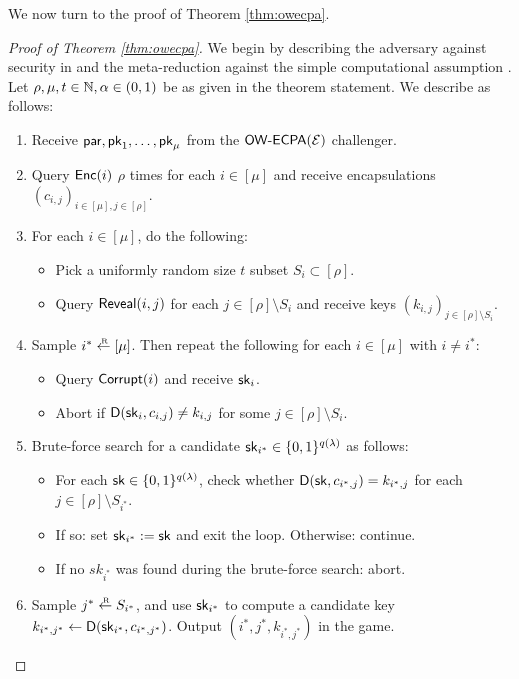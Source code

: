 We now turn to the proof of Theorem \ref{thm:owecpa}.
\begin{proof}[Proof of Theorem \ref{thm:owecpa}]
  We begin by describing the adversary \advA against \OWECPA security in \KEM
  and the meta-reduction \redM against the simple computational assumption \Simple.
  Let \(\rho, \mu, t \in \mathbb{N}, \alpha \in (0,1)\) be as given in the theorem statement.
  We describe \advA as follows:

  \begin{enumerate}[itemsep=0.1cm]
    \item Receive \(\mathsf{par}, \mathsf{pk}_{1}, \ldots, \mathsf{pk}_{\mu}\) from the \(\mathsf{OW}\text{-}\mathsf{ECPA}(\mathcal{E})\) challenger.
    \item Query \(\mathsf{Enc}(i)\) \(\rho\) times for each \(i \in [\mu]\) and receive encapsulations \((c_{i,j})_{i \in [\mu], j \in [\rho]}\).
    \item For each \(i \in [\mu]\), do the following:
          \begin{itemize}[label={\textbullet},itemsep=0.1cm]
            \item Pick a uniformly random size \(t\) subset \(S_{i} \subset [\rho]\).
            \item Query \(\mathsf{Reveal}(i,j)\) for each \(j \in [\rho] \setminus S_{i}\)
                  and receive keys \((k_{i,j})_{j \in [\rho] \setminus S_{i}}\).
          \end{itemize}
    \item\label{advA:corrupt} Sample \(i^{*} \sampleR [\mu]\). Then repeat the following for each \(i \in [\mu]\) with \(i \ne i^{*}\):
          \begin{itemize}[label={\textbullet},itemsep=0.1cm]
            \item Query \(\mathsf{Corrupt}(i)\) and receive \(\mathsf{sk}_{i}\).
            \item Abort if \(\mathsf{D}(\mathsf{sk}_{i},c_{i,j}) \ne k_{i,j}\) for some \(j \in [\rho] \setminus S_{i}\).
          \end{itemize}
     \item\label{advA:brute} Brute-force search for a candidate \(\mathsf{sk}_{i^{*}} \in \{0,1\}^{q(\lambda)}\) as follows:
          \begin{itemize}[label={\textbullet},itemsep=0.1cm]
            \item For each \(\mathsf{sk} \in \{0,1\}^{q(\lambda)}\),
                  check whether \(\mathsf{D}(\mathsf{sk},c_{i^{*},j}) = k_{i^{*},j}\) for each \(j \in [\rho] \setminus S_{i^{*}}\).
            \item If so: set \(\mathsf{sk}_{i^{*}} := \mathsf{sk}\) and exit the loop. Otherwise: continue.
            \item If no \(sk_{i^{*}}\) was found during the brute-force search: abort.
          \end{itemize}
    \item\label{advA:final} Sample \(j^{*} \sampleR S_{i^{*}}\),
          and use \(\mathsf{sk}_{i^{*}}\) to compute a candidate key \(k_{i^{*}, j^{*}} \leftarrow \mathsf{D}(\mathsf{sk}_{i^{*}},c_{i^{*}, j^{*}})\).
          Output \((i^{*}, j^{*}, k_{i^{*}, j^{*}})\) in the \OWECPA game.
  \end{enumerate}


\end{proof}
